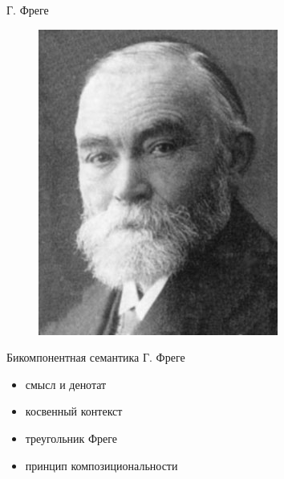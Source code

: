 \documentclass{beamer}
\begin{document}
\begin{frame}{Г. Фреге}
\begin{center}
	\begin{figure}[H]
		\includegraphics[scale=0.5]{frege.jpg} 
	\end{figure}
\end{center}
\end{frame}

\begin{frame}{Бикомпонентная семантика Г. Фреге}
\begin{itemize}
    \item смысл и денотат
	\item косвенный контекст
	\item треугольник Фреге
	\item принцип композициональности
\end{itemize}
\end{frame}
\end{document}
